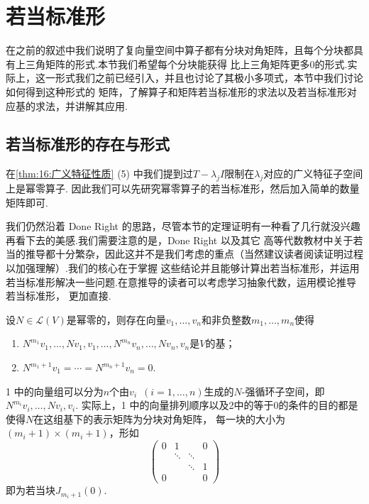 \chapter{若当标准形}
在之前的叙述中我们说明了复向量空间中算子都有分块对角矩阵，且每个分块都具有上三角矩阵的形式.本节我们希望每个分块能获得
比上三角矩阵更多0的形式.实际上，这一形式我们之前已经引入，并且也讨论了其极小多项式，本节中我们讨论如何得到这种形式的
矩阵，了解算子和矩阵若当标准形的求法以及若当标准形对应基的求法，并讲解其应用.

\section{若当标准形的存在与形式}
在\autoref{thm:16:广义特征性质} (5) 中我们提到过$T-\lambda_jI$限制在$\lambda_j$对应的广义特征子空间上是幂零算子.
因此我们可以先研究幂零算子的若当标准形，然后加入简单的数量矩阵即可.

我们仍然沿着 Done Right 的思路，尽管本节的定理证明有一种看了几行就没兴趣再看下去的美感.我们需要注意的是，Done Right 以及其它
高等代数教材中关于若当的推导都十分繁杂，因此这并不是我们考虑的重点（当然建议读者阅读证明过程以加强理解）.我们的核心在于掌握
这些结论并且能够计算出若当标准形，并运用若当标准形解决一些问题.在意推导的读者可以考虑学习抽象代数，运用模论推导若当标准形，
更加直接.
\begin{theorem} \label{thm:18:若当基存在}
    设$N\in \mathcal{L}(V)$是幂零的，则存在向量$v_1,\ldots,v_n$和非负整数$m_1,\ldots,m_n$使得
    \begin{enumerate}
        \item $N^{m_1}v_1,\ldots,Nv_1,v_1,\ldots,N^{m_n}v_n,\ldots,Nv_n,v_n$是$V$的基；

        \item $N^{m_1+1}v_1=\cdots=N^{m_n+1}v_n=0$.
    \end{enumerate}
\end{theorem}
1 中的向量组可以分为$n$个由$v_i\enspace(i=1,\ldots,n)$生成的$N$-强循环子空间，即$N^{m_i}v_i,\ldots,Nv_i,v_i$.
实际上，1 中的向量排列顺序以及2中的等于0的条件的目的都是使得$N$在这组基下的表示矩阵为分块对角矩阵，
每一块的大小为$(m_i+1)\times(m_i+1)$，形如\[\begin{pmatrix}
    0 & 1 &  & 0 \\  & \ddots & \ddots &  \\  &  &  \ddots & 1 \\ 0 &  &  & 0
\end{pmatrix}\]即为若当块$J_{m_i+1}(0)$.

